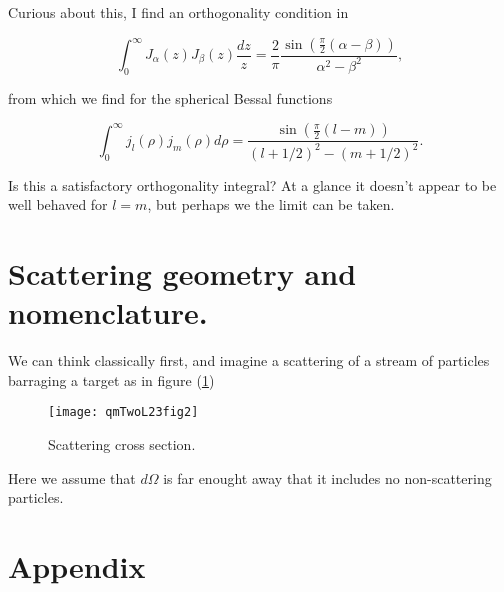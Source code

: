 Curious about this, I find an orthogonality condition in \cite{wiki:bessel}

\begin{equation}\label{eqn:qmTwoL23:640}
\int_0^\infty J_\alpha(z) J_\beta(z) \frac{dz}{z} = \frac{2}{\pi} \frac{\sin\left(\frac{\pi}{2}\left( \alpha - \beta\right) \right) }{\alpha^2 - \beta^2},
\end{equation}

from which we find for the spherical Bessal functions

\begin{equation}\label{eqn:qmTwoL23:660}
\int_0^\infty j_l(\rho) j_m(\rho) d\rho = 
\frac{\sin\left(\frac{\pi}{2}\left( l - m \right) \right) }{(l+ 1/2)^2 - (m + 1/2)^2}.
\end{equation}

Is this a satisfactory orthogonality integral?  At a glance it doesn't appear to be well behaved for $l = m$, but perhaps we the limit can be taken.

\section{Scattering geometry and nomenclature.}

We can think classically first, and imagine a scattering of a stream of particles barraging a target as in 
figure (\ref{fig:qmTwoL23:qmTwoL23fig2})

\begin{figure}[htp]
   \centering
   \texttt{[image: qmTwoL23fig2]}
   \caption{Scattering cross section.}\label{fig:qmTwoL23:qmTwoL23fig2}
\end{figure}

Here we assume that $d\Omega$ is far enought away that it includes no non-scattering particles.

\section{Appendix}

\EndArticle
